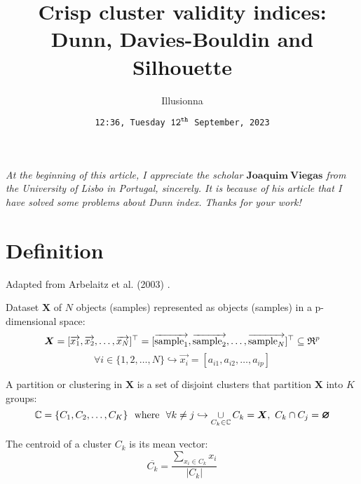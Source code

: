\documentclass{article}
\newcommand*{\shallowRed}{\color[rgb]{1 0.2 0.5}}
\begin{document}
\title{Crisp cluster validity indices:\\ Dunn, Davies-Bouldin and Silhouette}
\author{Illusionna}
\date{\tt\small 12:36, Tuesday $\tt 12^{\tt th}$ September, 2023}
\maketitle
\vspace*{-16em}
\vspace*{12em}

{\color[rgb]{0.5 0.5 0.5}\it
At the beginning of this article, I appreciate the scholar $\boldsymbol{Joaquim\ Viegas}$ from the University of Lisbo in Portugal, sincerely. It is because of his article that I have solved some problems about Dunn index. Thanks for your work!
}


\thispagestyle{empty}
\section{Definition}
Adapted from Arbelaitz et al. (2003) \cite{ref1}.

Dataset $\bm X$ of $N$ objects (samples) represented as objects (samples) in a p-dimensional space:
\[ \bm{X}=[\overrightarrow{x_1},\overrightarrow{x_2},\dots,\overrightarrow{x_N}]^{\top}=[\overrightarrow{{\rm sample}_1},\overrightarrow{{\rm sample}_2},\dots,\overrightarrow{{\rm sample}_N}]^{\top}\subseteq\mathfrak{R}^p \]
\[ \forall i\in\{1,2,\dots,N\}\hookrightarrow\overrightarrow{x_i}=[a_{i1},a_{i2},\dots,a_{ip}] \]

A partition or clustering in $\bm X$ is a set of disjoint clusters that partition $\bm X$ into $K$ groups:
\[ \mathbb{C}=\{C_1,C_2,\dots,C_K\}\ \ {\rm where}\ \ \forall k\ne j \hookrightarrow \mathop{\cup}\limits_{C_k\in \mathbb{C}}C_k=\bm{X},\ C_k\cap C_j=\bm{\varnothing} \]

The centroid of a cluster $C_k$ is its mean vector:
\[ \overline{C_k} =\dfrac{\sum\limits_{x_i\in C_k}x_i}{|C_k|} \]
\end{document}
